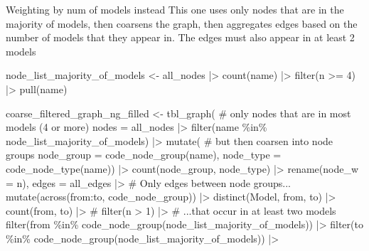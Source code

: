 \documentclass[
  letterpaper,
  DIV=11,
  numbers=noendperiod]{scrartcl}
\newenvironment{Shaded}{\begin{snugshade}}{\end{snugshade}}
\newcommand{\AttributeTok}[1]{\textcolor[rgb]{0.40,0.45,0.13}{#1}}
\newcommand{\CommentTok}[1]{\textcolor[rgb]{0.37,0.37,0.37}{#1}}
\newcommand{\DecValTok}[1]{\textcolor[rgb]{0.68,0.00,0.00}{#1}}
\newcommand{\FunctionTok}[1]{\textcolor[rgb]{0.28,0.35,0.67}{#1}}
\newcommand{\NormalTok}[1]{\textcolor[rgb]{0.00,0.23,0.31}{#1}}
\newcommand{\OtherTok}[1]{\textcolor[rgb]{0.00,0.23,0.31}{#1}}
\newcommand{\SpecialCharTok}[1]{\textcolor[rgb]{0.37,0.37,0.37}{#1}}
\begin{document}
Weighting by num of models instead This one uses only nodes that are in
the majority of models, then coarsens the graph, then aggregates edges
based on the number of models that they appear in. The edges must also
appear in at least 2 models

\begin{Shaded}
\begin{Highlighting}[]
\NormalTok{node\_list\_majority\_of\_models }\OtherTok{\textless{}{-}} 
\NormalTok{    all\_nodes }\SpecialCharTok{|\textgreater{}} 
    \FunctionTok{count}\NormalTok{(name) }\SpecialCharTok{|\textgreater{}} 
    \FunctionTok{filter}\NormalTok{(n }\SpecialCharTok{\textgreater{}=} \DecValTok{4}\NormalTok{) }\SpecialCharTok{|\textgreater{}} 
    \FunctionTok{pull}\NormalTok{(name)}

\NormalTok{coarse\_filtered\_graph\_ng\_filled }\OtherTok{\textless{}{-}} 
    \FunctionTok{tbl\_graph}\NormalTok{( }\CommentTok{\# only nodes that are in most models (4 or more)}
        \AttributeTok{nodes =}\NormalTok{ all\_nodes }\SpecialCharTok{|\textgreater{}} 
            \FunctionTok{filter}\NormalTok{(name }\SpecialCharTok{\%in\%}\NormalTok{ node\_list\_majority\_of\_models) }\SpecialCharTok{|\textgreater{}} 
            \FunctionTok{mutate}\NormalTok{( }\CommentTok{\# but then coarsen into node groups}
                \AttributeTok{node\_group =} \FunctionTok{code\_node\_group}\NormalTok{(name),}
                   \AttributeTok{node\_type =} \FunctionTok{code\_node\_type}\NormalTok{(name)) }\SpecialCharTok{|\textgreater{}} 
            \FunctionTok{count}\NormalTok{(node\_group, node\_type) }\SpecialCharTok{|\textgreater{}} 
            \FunctionTok{rename}\NormalTok{(}\AttributeTok{node\_w =}\NormalTok{ n),}
        \AttributeTok{edges =}\NormalTok{     all\_edges }\SpecialCharTok{|\textgreater{}} \CommentTok{\# Only edges between node groups...}
            \FunctionTok{mutate}\NormalTok{(}\FunctionTok{across}\NormalTok{(from}\SpecialCharTok{:}\NormalTok{to, code\_node\_group)) }\SpecialCharTok{|\textgreater{}}
            \FunctionTok{distinct}\NormalTok{(Model, from, to) }\SpecialCharTok{|\textgreater{}} 
            \FunctionTok{count}\NormalTok{(from, to) }\SpecialCharTok{|\textgreater{}}
            \CommentTok{\# filter(n \textgreater{} 1) |\textgreater{} \# ...that occur in at least two models}
            \FunctionTok{filter}\NormalTok{(from }\SpecialCharTok{\%in\%} \FunctionTok{code\_node\_group}\NormalTok{(node\_list\_majority\_of\_models)) }\SpecialCharTok{|\textgreater{}}
            \FunctionTok{filter}\NormalTok{(to }\SpecialCharTok{\%in\%} \FunctionTok{code\_node\_group}\NormalTok{(node\_list\_majority\_of\_models)) }\SpecialCharTok{|\textgreater{}}

\end{Highlighting}
\end{Shaded}
\end{document}
